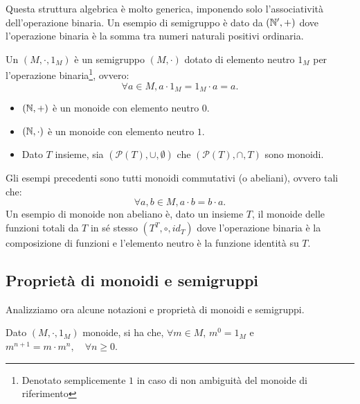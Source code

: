 Questa struttura algebrica è molto generica, imponendo solo l'associatività dell'operazione binaria.
Un esempio di semigruppo è dato da \((\mathbb{N}',+)\) dove l'operazione binaria è la somma tra numeri naturali positivi ordinaria.

\begin{definition}[Monoide]
  Un  \((M,\cdot,1_M)\) è un semigruppo \((M, \cdot)\) dotato di elemento neutro \(1_M\) per l'operazione binaria\footnote{Denotato semplicemente \(1\) in caso di non ambiguità del monoide di riferimento}, ovvero:
  \[\forall a \in M, a \cdot 1_M = 1_M \cdot a = a.\]
\end{definition}

\begin{example}
  \begin{itemize}
    \item \((\mathbb{N}, +)\) è un monoide con elemento neutro \(0\).
    \item \((\mathbb{N}, \cdot)\) è un monoide con elemento neutro \(1\).
    \item Dato \(T\) insieme, sia \((\mathcal{P}(T), \cup, \emptyset)\) che \((\mathcal{P}(T), \cap, T)\) sono monoidi.
  \end{itemize}
  Gli esempi precedenti sono tutti monoidi commutativi (o abeliani), ovvero tali che:
  \[\forall a,b \in M, a \cdot b = b \cdot a.\]
  Un esempio di monoide non abeliano è, dato un insieme \(T\), il monoide delle funzioni totali da \(T\) in sé stesso \((T^{T}, \circ, id_T)\) dove l'operazione binaria è la composizione di funzioni e l'elemento neutro è la funzione identità su \(T\).
\end{example}

\subsection{Proprietà di monoidi e semigruppi}

Analizziamo ora alcune notazioni e proprietà di monoidi e semigruppi.

\begin{note}\label{note:power_notation}
  Dato \((M,\cdot,1_M)\) monoide, si ha che, \(\forall m \in M\), \(m^0 = 1_M\) e \(m^{n+1} = m \cdot m^n, \quad \forall n \geq 0\).
\end{note}

